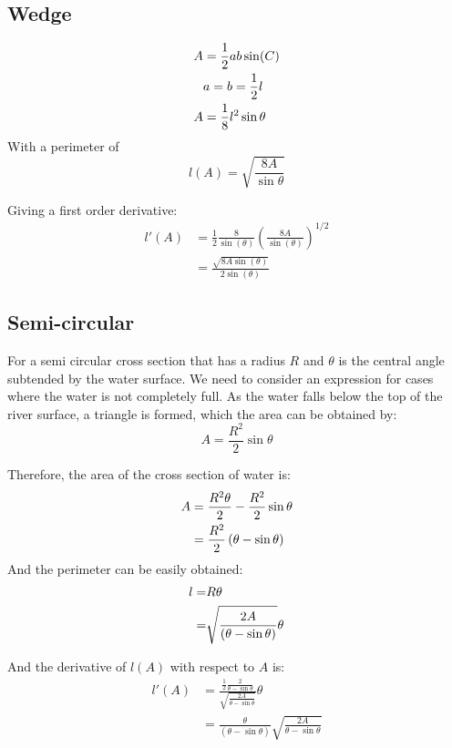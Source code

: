 \documentclass[12pt]{article}
\begin{document}
\subsection{Wedge}
\label{appendix:wedge}
\begin{align}
    A &= \frac{1}{2}ab\sin(C) \notag
    \\&a = b = \frac{1}{2}l \notag
    \\A &= \frac{1}{8}l^2\sin{\theta}
\end{align}
With a perimeter of 
\begin{equation}
    l(A) = \sqrt{\frac{8A}{\sin{\theta}}}
\end{equation}

Giving a first order derivative:
\begin{equation}
    \begin{split}
          l'(A) &= \frac{1}{2}\frac{8}{\sin(\theta)}\left(\frac{8A}{\sin(\theta)}\right)^{1/2}
          \\&=\frac{\sqrt{8A\sin(\theta)}}{2\sin(\theta)}
    \end{split}
\end{equation}

\subsection{Semi-circular}
\label{appendix:semi-circular}
For a semi circular cross section that has a radius $R$ and $\theta$ is the central angle subtended by the water surface. We need to consider an expression for cases where the water is not completely full. As the water falls below the top of the river surface, a triangle is formed, which the area can be obtained by:
\begin{equation}
    A = \frac{R^2}{2} \sin\theta
\end{equation}

Therefore, the area of the cross section of water is:
\begin{align}
    A &=\frac{R^2 \theta}{2} - \frac{R^2}{2}\sin\theta \\
      &= \frac{R^2}{2}\left(\theta - \sin\theta\right) \notag
\end{align}
And the perimeter can be easily obtained:
\begin{align}
    l =& R\theta \\
        =& \sqrt{\frac{2A}{\left(\theta - \sin\theta\right)}}\theta \notag
\end{align}

And the derivative of $l(A)$ with respect to $A$ is:
\begin{equation}
    \begin{split}
         l'(A) &= \frac{\frac{1}{2}\frac{2}{\theta-\sin{\theta}}}{\sqrt{\frac{2A}{\theta-\sin{\theta}}}}\theta
        \\&= \frac{\theta}{(\theta-\sin{\theta})}\sqrt{\frac{2A}{\theta-\sin{\theta}}}
    \end{split}
\end{equation}
\end{document}
